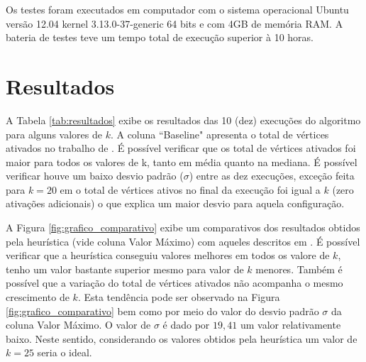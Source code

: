 \documentclass[12pt]{article}
\begin{document}
Os testes foram executados em computador com o sistema operacional Ubuntu versão 12.04 kernel 3.13.0-37-generic 64 bits e com 4GB de memória RAM. A bateria de testes teve um tempo total de execução superior à 10 horas.

\section{Resultados}
\label{sec:resultados}

A Tabela \ref{tab:resultados} exibe os resultados das 10 (dez) execuções do algoritmo para alguns valores de $k$. A coluna ``Baseline"{} apresenta o total de vértices ativados no trabalho de \cite{kempe2003maximizing}{}. É possível verificar que os total de vértices ativados foi maior para todos os valores de k, tanto em média quanto na mediana. É possível verificar houve um baixo desvio padrão ($\sigma$) entre as dez execuções, exceção feita para $k=20$ em o total de vértices ativos no final da execução foi igual a $k$ (zero ativações adicionais) o que explica um maior desvio para aquela configuração.

\begin{table}[h]
\centering
{}
\caption{Resultados para diversos valores de k}
\label{tab:resultados}
\end{table}

A Figura \ref{fig:grafico_comparativo} exibe um comparativos dos resultados obtidos pela heurística (vide coluna Valor Máximo) com aqueles descritos em \cite{kempe2003maximizing}. É possível verificar que a heurística conseguiu valores melhores em todos os valore de $k$, tenho um valor bastante superior mesmo para valor de $k$ menores. Também é possível que a variação do total de vértices ativados não acompanha o mesmo crescimento de $k$. Esta tendência pode ser observado na Figura \ref{fig:grafico_comparativo} bem como por meio do valor do desvio padrão $\sigma$ da coluna Valor Máximo. O valor de $\sigma$ é dado por $19,41$ um valor relativamente baixo. Neste sentido, considerando os valores obtidos pela heurística um valor de $k= 25$ seria o ideal.
\end{document}
